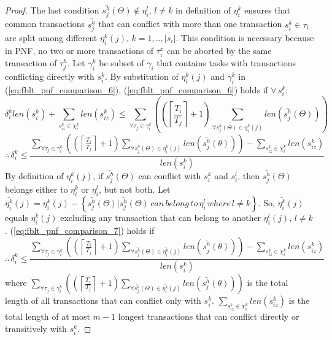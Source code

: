 \documentclass[prodmode,acmtecs]{acmsmall}
\begin{document}
\begin{compactenum}
\begin{proof}
The last condition $\bar{s_{j}^{h}}(\Theta)\not\in\eta_{i}^{l},\, l\ne k$
in definition of $\eta_{i}^{k}$ ensures that common transactions
$\bar{s_{j}^{h}}$ that can conflict with more than one transaction
$s_{i}^{k}\in\tau_{i}$ are split among different $\eta_{i}^{k}(j),\, k=1,..,|s_{i}|$.
This condition is necessary because in PNF, no two or more transactions
of $\tau_{i}^{x}$ can be aborted by the same transaction of $\tau_{j}^{h}$.
Let $\gamma_{i}^{k}$ be subset of $\gamma_{i}$ that contains tasks
with transactions conflicting directly with $s_{i}^{k}$. By substitution
of $\eta_{i}^{k}(j)$ and $\gamma_{i}^{k}$ in (\ref{eq:fblt_pnf_comparison_6}),
(\ref{eq:fblt_pnf_comparison_6}) holds if $\forall\, s_{i}^{k}$:
\[
\delta_{i}^{k}len(s_{i}^{k})+\sum_{s_{iz}^{k}\in\chi_{i}^{k}}len(s_{iz}^{k})\le\sum_{\forall\tau_{j}\in\gamma_{i}^{k}}\left(\left(\left\lceil \frac{T_{i}}{T_{j}}\right\rceil +1\right)\sum_{\forall\bar{s_{j}^{h}}(\Theta)\in\eta_{i}^{k}(j)}len\left(\bar{s_{j}^{h}}(\Theta)\right)\right)
\]
\begin{equation}
\therefore\,\delta_{i}^{k}\le\frac{\sum_{\forall\tau_{j}\in\gamma_{i}^{k}}\left(\left(\left\lceil \frac{T_{i}}{T_{j}}\right\rceil +1\right)\sum_{\forall\bar{s_{j}^{h}}(\Theta)\in\eta_{i}^{k}(j)}len\left(\bar{s_{j}^{h}}(\theta)\right)\right)-\sum_{s_{iz}^{k}\in\chi_{i}^{k}}len(s_{iz}^{k})}{len(s_{i}^{k})}\label{eq:fblt_pnf_comparison_7}
\end{equation}
By definition of $\eta_{i}^{k}(j)$, if $\bar{s_{j}^{h}}(\Theta)$
can conflict with $s_{i}^{k}$ and $s_{i}^{l}$, then $\bar{s_{j}^{h}}(\Theta)$
belongs either to $\eta_{i}^{k}$ or $\eta_{i}^{l}$, but not both.
Let $\bar{\eta_{i}^{k}}(j)=\eta_{i}^{k}(j)-\left\{ \bar{s_{j}^{h}}(\Theta)|\bar{s_{j}^{h}}(\Theta)\, can\, belong\, to\,\eta_{i}^{l}\, where\, l\neq k\right\} $.
So, $\bar{\eta_{i}^{k}}(j)$ equals $\eta_{i}^{k}(j)$ excluding any
transaction that can belong to another $\eta_{i}^{l}(j),\, l\neq k$.
(\ref{eq:fblt_pnf_comparison_7}) holds if 
\begin{equation}
\therefore\,\delta_{i}^{k}\le\frac{\sum_{\forall\tau_{j}\in\gamma_{i}^{k}}\left(\left(\left\lceil \frac{T_{i}}{T_{j}}\right\rceil +1\right)\sum_{\forall\bar{s_{j}^{h}}(\Theta)\in\bar{\eta_{i}^{k}}(j)}len\left(\bar{s_{j}^{h}}(\theta)\right)\right)-\sum_{s_{iz}^{k}\in\chi_{i}^{k}}len(s_{iz}^{k})}{len(s_{i}^{k})}\label{eq:fblt_pnf_comparison_8}
\end{equation}
where $\sum_{\forall\tau_{j}\in\gamma_{i}^{k}}\left(\left(\left\lceil \frac{T_{i}}{T_{j}}\right\rceil +1\right)\sum_{\forall\bar{s_{j}^{h}}(\Theta)\in\bar{\eta_{i}^{k}}(j)}len\left(\bar{s_{j}^{h}}(\theta)\right)\right)$
is the total length of all transactions that can conflict only with
$s_{i}^{k}$. $\sum_{s_{iz}^{k}\in\chi_{i}^{k}}len(s_{iz}^{k})$ is
the total length of at most $m-1$ longest transactions that can conflict
directly or transitively with $s_{i}^{k}$.


\end{proof}
\end{compactenum}
\end{document}
